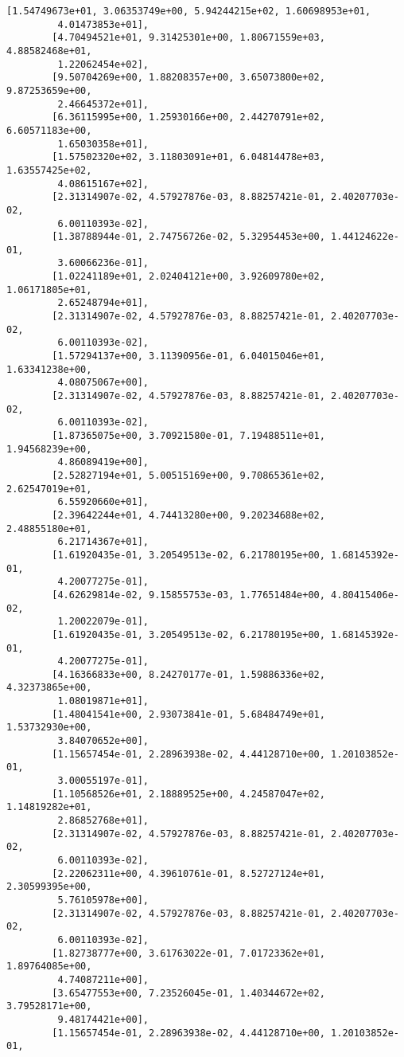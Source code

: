 \documentclass[11pt]{article}
\begin{document}
\begin{tcolorbox}[breakable, size=fbox, boxrule=.5pt, pad at break*=1mm, opacityfill=0]
\begin{Verbatim}[commandchars=\\\{\}]
        [1.54749673e+01, 3.06353749e+00, 5.94244215e+02, 1.60698953e+01,
         4.01473853e+01],
        [4.70494521e+01, 9.31425301e+00, 1.80671559e+03, 4.88582468e+01,
         1.22062454e+02],
        [9.50704269e+00, 1.88208357e+00, 3.65073800e+02, 9.87253659e+00,
         2.46645372e+01],
        [6.36115995e+00, 1.25930166e+00, 2.44270791e+02, 6.60571183e+00,
         1.65030358e+01],
        [1.57502320e+02, 3.11803091e+01, 6.04814478e+03, 1.63557425e+02,
         4.08615167e+02],
        [2.31314907e-02, 4.57927876e-03, 8.88257421e-01, 2.40207703e-02,
         6.00110393e-02],
        [1.38788944e-01, 2.74756726e-02, 5.32954453e+00, 1.44124622e-01,
         3.60066236e-01],
        [1.02241189e+01, 2.02404121e+00, 3.92609780e+02, 1.06171805e+01,
         2.65248794e+01],
        [2.31314907e-02, 4.57927876e-03, 8.88257421e-01, 2.40207703e-02,
         6.00110393e-02],
        [1.57294137e+00, 3.11390956e-01, 6.04015046e+01, 1.63341238e+00,
         4.08075067e+00],
        [2.31314907e-02, 4.57927876e-03, 8.88257421e-01, 2.40207703e-02,
         6.00110393e-02],
        [1.87365075e+00, 3.70921580e-01, 7.19488511e+01, 1.94568239e+00,
         4.86089419e+00],
        [2.52827194e+01, 5.00515169e+00, 9.70865361e+02, 2.62547019e+01,
         6.55920660e+01],
        [2.39642244e+01, 4.74413280e+00, 9.20234688e+02, 2.48855180e+01,
         6.21714367e+01],
        [1.61920435e-01, 3.20549513e-02, 6.21780195e+00, 1.68145392e-01,
         4.20077275e-01],
        [4.62629814e-02, 9.15855753e-03, 1.77651484e+00, 4.80415406e-02,
         1.20022079e-01],
        [1.61920435e-01, 3.20549513e-02, 6.21780195e+00, 1.68145392e-01,
         4.20077275e-01],
        [4.16366833e+00, 8.24270177e-01, 1.59886336e+02, 4.32373865e+00,
         1.08019871e+01],
        [1.48041541e+00, 2.93073841e-01, 5.68484749e+01, 1.53732930e+00,
         3.84070652e+00],
        [1.15657454e-01, 2.28963938e-02, 4.44128710e+00, 1.20103852e-01,
         3.00055197e-01],
        [1.10568526e+01, 2.18889525e+00, 4.24587047e+02, 1.14819282e+01,
         2.86852768e+01],
        [2.31314907e-02, 4.57927876e-03, 8.88257421e-01, 2.40207703e-02,
         6.00110393e-02],
        [2.22062311e+00, 4.39610761e-01, 8.52727124e+01, 2.30599395e+00,
         5.76105978e+00],
        [2.31314907e-02, 4.57927876e-03, 8.88257421e-01, 2.40207703e-02,
         6.00110393e-02],
        [1.82738777e+00, 3.61763022e-01, 7.01723362e+01, 1.89764085e+00,
         4.74087211e+00],
        [3.65477553e+00, 7.23526045e-01, 1.40344672e+02, 3.79528171e+00,
         9.48174421e+00],
        [1.15657454e-01, 2.28963938e-02, 4.44128710e+00, 1.20103852e-01,

\end{Verbatim}
\end{tcolorbox}
\end{document}
